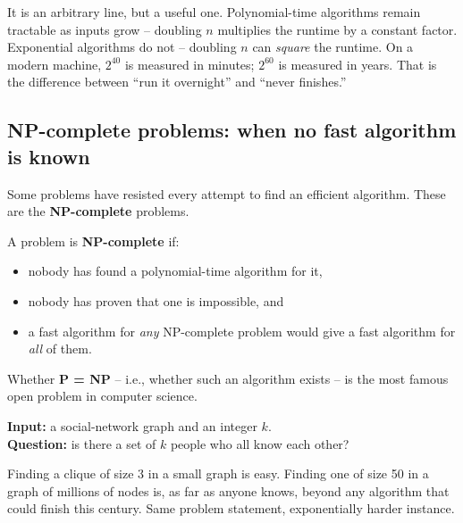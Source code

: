 \documentclass[11pt]{article}
\begin{document}
\begin{notebox}
It is an arbitrary line, but a useful one. Polynomial-time algorithms
remain tractable as inputs grow -- doubling $n$ multiplies the runtime
by a constant factor. Exponential algorithms do not -- doubling $n$
can \emph{square} the runtime. On a modern machine, $2^{40}$ is
measured in minutes; $2^{60}$ is measured in years. That is the
difference between ``run it overnight'' and ``never finishes.''
\end{notebox}

\subsection{NP-complete problems: when no fast algorithm is known}

Some problems have resisted every attempt to find an efficient
algorithm. These are the \textbf{NP-complete} problems.

\begin{defnbox}
A problem is \textbf{NP-complete} if:
\begin{itemize}[leftmargin=*,noitemsep]
    \item nobody has found a polynomial-time algorithm for it,
    \item nobody has proven that one is impossible, and
    \item a fast algorithm for \emph{any} NP-complete problem would
          give a fast algorithm for \emph{all} of them.
\end{itemize}
Whether \textbf{P = NP} -- i.e., whether such an algorithm exists -- is
the most famous open problem in computer science.
\end{defnbox}

\begin{examplebox}
\textbf{Input:} a social-network graph and an integer $k$. \\
\textbf{Question:} is there a set of $k$ people who all know each other?

Finding a clique of size 3 in a small graph is easy. Finding one of
size 50 in a graph of millions of nodes is, as far as anyone knows,
beyond any algorithm that could finish this century. Same problem
statement, exponentially harder instance.
\end{examplebox}
\end{document}
